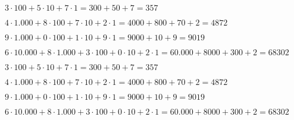 \begin{rlist}
\item $ 3\cdot100+5\cdot10+7\cdot1=300+50+7=357  $
\item $ 4\cdot1.000+8\cdot100+7\cdot10+2\cdot1=4000+800+70+2=4872 $
\item $ 9\cdot1.000+0\cdot100+1\cdot10+9\cdot1=9000+10+9=9019 $
\item $ 6\cdot10.000+8\cdot1.000+3\cdot100+0\cdot10+2\cdot1=60.000+8000+300+2=68302 $
\end{rlist}
\begin{rlist}
\item $ 3\cdot100+5\cdot10+7\cdot1=300+50+7=357  $
\item $ 4\cdot1.000+8\cdot100+7\cdot10+2\cdot1=4000+800+70+2=4872 $
\item $ 9\cdot1.000+0\cdot100+1\cdot10+9\cdot1=9000+10+9=9019 $
\item $ 6\cdot10.000+8\cdot1.000+3\cdot100+0\cdot10+2\cdot1=60.000+8000+300+2=68302 $
\end{rlist}
